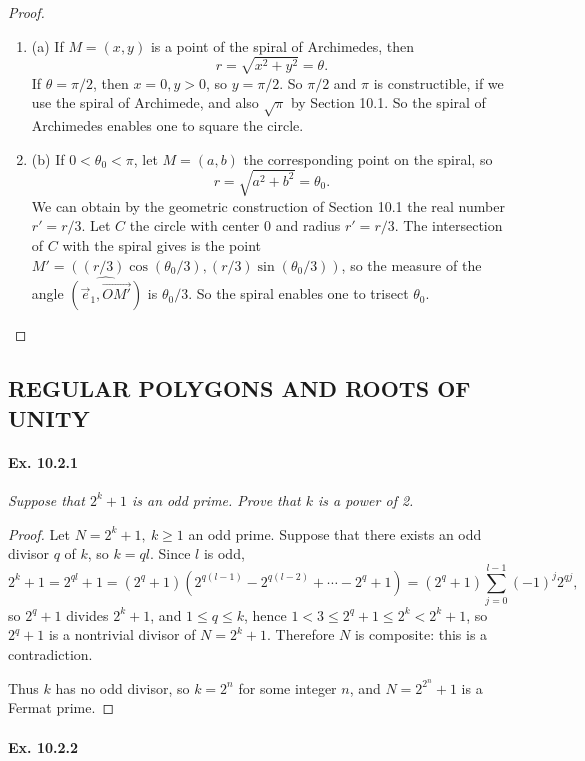 \documentclass[11pt,a4paper]{article}
\newcommand{\be} {\begin{enumerate}}
\newcommand{\ee} {\end{enumerate}}
\begin{document}
\begin{proof}
\be
\item[(a)] If $M =(x,y)$ is a point of the spiral of Archimedes, then
$$r =\sqrt{x^2+y^2} = \theta.$$
If $\theta = \pi /2$, then $x = 0, y>0$, so $y = \pi/2$.
So $\pi/2$ and $\pi$ is constructible, if we use the spiral of Archimede, and also $\sqrt{\pi}$ by Section 10.1. So the spiral of Archimedes enables one to square the circle.

\item[(b)] If $0 < \theta_0 < \pi$, let $M=(a,b)$ the corresponding point on the spiral, so $$r = \sqrt{a^2+b^2} = \theta_0.$$ We can obtain by the geometric construction of Section 10.1 the real number $r' = r/3$. Let $C$ the circle with center 0 and radius $r' = r/3$. The intersection of $C$ with the spiral gives is the point $M' = ((r/3)\cos(\theta_0/3),(r/3)\sin(\theta_0/3))$, so the measure of the angle $\widehat{(\vec{e}_1,\overrightarrow{OM'})}$ is $\theta_0 /3$. So the spiral enables one to trisect $\theta_0$. 
\ee
\end{proof}

\subsection{REGULAR POLYGONS AND ROOTS OF UNITY}

\paragraph{Ex. 10.2.1}

{\it Suppose that $2^k+1$ is an odd prime. Prove that $k$ is a power of 2.
}

\begin{proof}Let $N = 2^k + 1, \ k\geq 1$ an odd prime. Suppose that there exists an odd divisor $q$ of $k$, so $k = ql$. Since $l$ is odd,
$$2^k+1 =2^{ql}+1 = (2^q + 1)(2^{q(l-1)} - 2^{q(l-2)}+ \cdots -2^q + 1) = (2^q+1)\sum_{j=0}^{l-1} (-1)^j 2^{qj},$$
so $2^q + 1$ divides $2^k+1$, and $1\leq q \leq k$, hence $ 1< 3 \leq 2^q + 1 \leq 2^k < 2^k+1$, so $2^q + 1$ is a nontrivial divisor of $N = 2^k+1$. Therefore $N$ is composite: this is a contradiction.

 Thus $k$ has no odd divisor, so $k = 2^n$ for some integer $n$, and $N = 2^{2^n}+ 1$ is a Fermat prime.
\end{proof}

\paragraph{Ex. 10.2.2}
\end{document}
